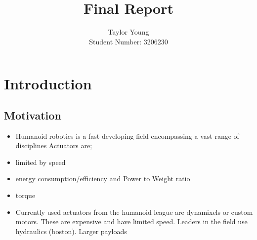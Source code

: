 \documentclass[11pt,a4paper]{article}
\title{Final Report}
\author{Taylor Young\\Student Number: 3206230}
\newcommand{\blankpage}{
\newpage
\thispagestyle{empty}
\mbox{}
\newpage
\addtocounter{page}{-1}
}
\begin{document}
\def\isfinalreport{1}

\blankpage
{}



\blankpage


\blankpage


\blankpage

\tableofcontents
\newpage


\section{Introduction}
\label{sec:introduction}



\subsection{Motivation}
\label{sub:motivation}


\begin{itemize}
\item Humanoid robotics is a fast developing field encompassing a vast range of disciplines Actuators are;
\item limited by speed
\item energy consumption/efficiency and Power to Weight ratio
\item torque
\item Currently used actuators from the humanoid league are dynamixels or custom motors. These are expensive and have limited speed. Leaders in the field use hydraulics (boston). Larger payloads
\end{itemize}
\end{document}
